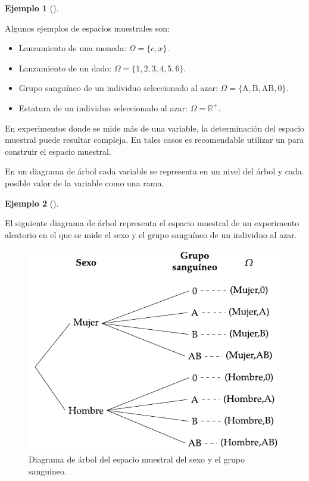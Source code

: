 \documentclass[
  a4paper,
]{scrreport}
\providecommand{\tightlist}{%
  \setlength{\itemsep}{0pt}\setlength{\parskip}{0pt}}\usepackage{longtable,booktabs,array}
\theoremstyle{plain}
\theoremstyle{definition}
\theoremstyle{definition}
\newtheorem{example}{Ejemplo}[chapter]
\theoremstyle{remark}
\begin{document}
\begin{example}[]\protect\hypertarget{exm-espacios-muestrales}{}\label{exm-espacios-muestrales}

Algunos ejemplos de espacios muestrales son:

\begin{itemize}
\tightlist
\item
  Lanzamiento de una moneda: \(\Omega=\{c,x\}\).
\item
  Lanzamiento de un dado: \(\Omega=\{1,2,3,4,5,6\}\).
\item
  Grupo sanguíneo de un individuo seleccionado al azar:
  \(\Omega=\{\mbox{A},\mbox{B},\mbox{AB},\mbox{0}\}\).
\item
  Estatura de un individuo seleccionado al azar:
  \(\Omega=\mathbb{R}^+\).
\end{itemize}

\end{example}

En experimentos donde se mide más de una variable, la determinación del
espacio muestral puede resultar compleja. En tales casos es recomendable
utilizar un para construir el espacio muestral.

En un diagrama de árbol cada variable se representa en un nivel del
árbol y cada posible valor de la variable como una rama.

\begin{example}[]\protect\hypertarget{exm-diagrama-arbol}{}\label{exm-diagrama-arbol}

El siguiente diagrama de árbol representa el espacio muestral de un
experimento aleatorio en el que se mide el sexo y el grupo sanguíneo de
un individuo al azar.

\begin{figure}[H]

{\centering \includegraphics{img/probabilidad/espacio_muestral.pdf}

}

\caption{Diagrama de árbol del espacio muestral del sexo y el grupo
sanguineo.}

\end{figure}%

\end{example}
\end{document}
